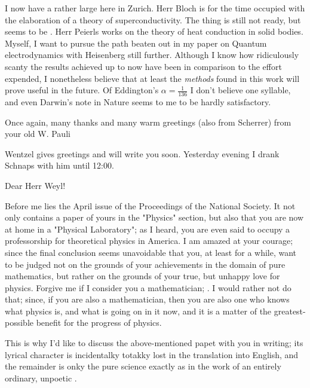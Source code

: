 \documentclass{article}
\begin{document}
I now have a rather large  here in Zurich. Herr Bloch is for the time occupied with the elaboration of a theory of superconductivity. The thing is still not ready, but seems to be . Herr Peierls works on the theory of heat conduction in solid bodies. Myself, I want to pursue the path beaten out in my paper on Quantum electrodynamics with Heisenberg still further. Although I know how ridiculously scanty the results achieved up to now have been in comparison to the effort expended, I nonetheless believe that at least the \textit{methods} found in this work will prove useful in the future. Of Eddington's $\alpha=\frac{1}{136}$ I don't believe one syllable, and even Darwin's note in Nature seems to me to be hardly satisfactory.

Once again, many thanks and many warm greetings (also from Scherrer) from your old
W. Pauli

Wentzel gives greetings and will write you soon. Yesterday evening I drank Schnaps with him until 12:00.

\date{July 1, 1929}

Dear Herr Weyl!

Before me lies the April issue of the Proceedings of the National Society. It not only contains a paper of yours in the "Physics" section, but also  that you are now at home in a "Physical Laboratory"; as I heard, you are even said to occupy a professorship for theoretical physics in America. I am amazed at your courage; since the final conclusion seems unavoidable that you, at least for a while, want to be judged not on the grounds of your achievements in the domain of pure mathematics, but rather on the grounds of your true, but unhappy love for physics. Forgive me if I  consider you a mathematician; . I would rather not do that; since, if you are also a mathematician, then you are also one who knows what physics is, and what is going on in it now, and it is a matter of  the greatest-possible benefit for the progress of physics.

This is why I'd like to discuss the above-mentioned papet with you in writing; its lyrical character is incidentalky totakky lost in the translation into English, and the remainder is onky the pure science exactly as in the work of an entirely ordinary, unpoetic .
\end{document}
